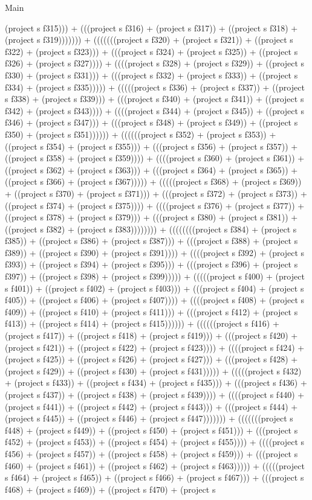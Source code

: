 \begin{lexlean}{Main}
\begin{semanticmodule}
{(project s f315))) + (((project s f316) + (project s f317)) + ((project s f318) + (project s f319))))))) + (((((((project s f320) + (project s f321)) + ((project s f322) + (project s f323))) + (((project s f324) + (project s f325)) + ((project s f326) + (project s f327)))) + ((((project s f328) + (project s f329)) + ((project s f330) + (project s f331))) + (((project s f332) + (project s f333)) + ((project s f334) + (project s f335))))) + (((((project s f336) + (project s f337)) + ((project s f338) + (project s f339))) + (((project s f340) + (project s f341)) + ((project s f342) + (project s f343)))) + ((((project s f344) + (project s f345)) + ((project s f346) + (project s f347))) + (((project s f348) + (project s f349)) + ((project s f350) + (project s f351)))))) + ((((((project s f352) + (project s f353)) + ((project s f354) + (project s f355))) + (((project s f356) + (project s f357)) + ((project s f358) + (project s f359)))) + ((((project s f360) + (project s f361)) + ((project s f362) + (project s f363))) + (((project s f364) + (project s f365)) + ((project s f366) + (project s f367))))) + (((((project s f368) + (project s f369)) + ((project s f370) + (project s f371))) + (((project s f372) + (project s f373)) + ((project s f374) + (project s f375)))) + ((((project s f376) + (project s f377)) + ((project s f378) + (project s f379))) + (((project s f380) + (project s f381)) + ((project s f382) + (project s f383)))))))) + ((((((((project s f384) + (project s f385)) + ((project s f386) + (project s f387))) + (((project s f388) + (project s f389)) + ((project s f390) + (project s f391)))) + ((((project s f392) + (project s f393)) + ((project s f394) + (project s f395))) + (((project s f396) + (project s f397)) + ((project s f398) + (project s f399))))) + (((((project s f400) + (project s f401)) + ((project s f402) + (project s f403))) + (((project s f404) + (project s f405)) + ((project s f406) + (project s f407)))) + ((((project s f408) + (project s f409)) + ((project s f410) + (project s f411))) + (((project s f412) + (project s f413)) + ((project s f414) + (project s f415)))))) + ((((((project s f416) + (project s f417)) + ((project s f418) + (project s f419))) + (((project s f420) + (project s f421)) + ((project s f422) + (project s f423)))) + ((((project s f424) + (project s f425)) + ((project s f426) + (project s f427))) + (((project s f428) + (project s f429)) + ((project s f430) + (project s f431))))) + (((((project s f432) + (project s f433)) + ((project s f434) + (project s f435))) + (((project s f436) + (project s f437)) + ((project s f438) + (project s f439)))) + ((((project s f440) + (project s f441)) + ((project s f442) + (project s f443))) + (((project s f444) + (project s f445)) + ((project s f446) + (project s f447))))))) + (((((((project s f448) + (project s f449)) + ((project s f450) + (project s f451))) + (((project s f452) + (project s f453)) + ((project s f454) + (project s f455)))) + ((((project s f456) + (project s f457)) + ((project s f458) + (project s f459))) + (((project s f460) + (project s f461)) + ((project s f462) + (project s f463))))) + (((((project s f464) + (project s f465)) + ((project s f466) + (project s f467))) + (((project s f468) + (project s f469)) + ((project s f470) + (project s }
\end{semanticmodule}
\end{lexlean}
